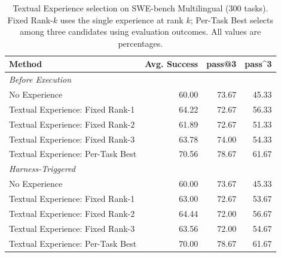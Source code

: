 \begin{table}[tb]
  \centering
  \small
  \caption{Textual Experience selection on SWE-bench Multilingual (300 tasks).
  Fixed Rank-$k$ uses the single experience at rank $k$; Per-Task Best selects among three candidates
  using evaluation outcomes. All values are percentages.}
  \label{tab:selection_multilingual}
  \begin{tabular}{lrrr}
    \toprule
    Method & Avg. Success & pass@3 & pass\textasciicircum{}3 \\
    \midrule
    \multicolumn{4}{l}{\textit{Before Execution}} \\
    No Experience                   & 60.00 & 73.67 & 45.33 \\
    Textual Experience: Fixed Rank-1             & 64.22 & 72.67 & 56.33 \\
    Textual Experience: Fixed Rank-2             & 61.89 & 72.67 & 51.33 \\
    Textual Experience: Fixed Rank-3             & 63.78 & 74.00 & 54.33 \\
    Textual Experience: Per-Task Best           & 70.56 & 78.67 & 61.67 \\
    \midrule
    \multicolumn{4}{l}{\textit{Harness-Triggered}} \\
    No Experience                   & 60.00 & 73.67 & 45.33 \\
    Textual Experience: Fixed Rank-1             & 63.00 & 72.67 & 53.67 \\
    Textual Experience: Fixed Rank-2             & 64.44 & 72.00 & 56.67 \\
    Textual Experience: Fixed Rank-3             & 63.56 & 72.00 & 54.67 \\
    Textual Experience: Per-Task Best           & 70.00 & 78.67 & 61.67 \\
    \bottomrule
  \end{tabular}
\end{table}

